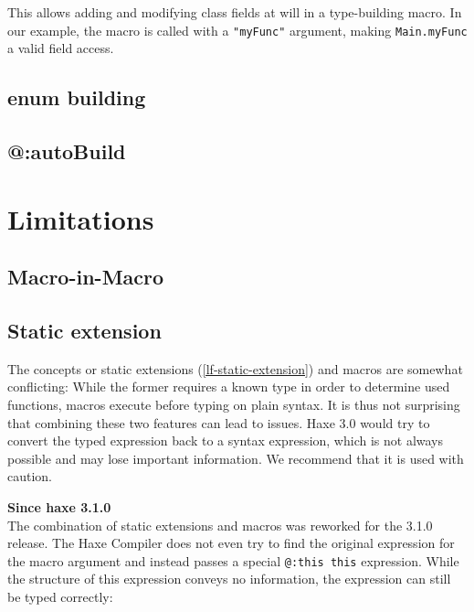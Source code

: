 \documentclass[a4paper,oneside]{book}
\newcommand{\expr}[1]{\texttt{#1}}
\newcommand{\tref}[2]{#1 (\ref{#2})}
\newcommand{\since}[1]{\noindent\textbf{Since haxe #1}\\}
\newcommand{\haxe}[2][]{%
}
\begin{document}
This allows adding and modifying class fields at will in a type-building macro. In our example, the macro is called with a \expr{"myFunc"} argument, making \expr{Main.myFunc} a valid field access.

\subsection{enum building}
\label{macro-enum-building}

\subsection{@:autoBuild}
\label{macro-auto-build}



\section{Limitations}
\label{macro-limitations}

\subsection{Macro-in-Macro}
\label{macro-limitations-macro-in-macro}

\subsection{Static extension}
\label{macro-limitations-static-extension}

The concepts or \tref{static extensions}{lf-static-extension} and macros are somewhat conflicting: While the former requires a known type in order to determine used functions, macros execute before typing on plain syntax. It is thus not surprising that combining these two features can lead to issues. Haxe 3.0 would try to convert the typed expression back to a syntax expression, which is not always possible and may lose important information. We recommend that it is used with caution.

\since{3.1.0}

The combination of static extensions and macros was reworked for the 3.1.0 release. The Haxe Compiler does not even try to find the original expression for the macro argument and instead passes a special \expr{@:this this} expression. While the structure of this expression conveys no information, the expression can still be typed correctly:

\haxe{assets/MacroStaticExtension.hx}
\end{document}
